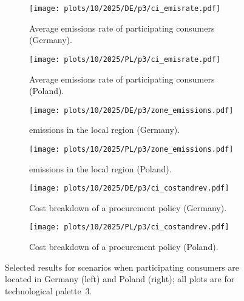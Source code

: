 \begin{figure*}
    \centering
    \begin{subfigure}{0.5\textwidth}
        \centering
        \caption{Average emissions rate of participating consumers (Germany).}
        \texttt{[image: plots/10/2025/DE/p3/ci\_emisrate.pdf]}
        \label{fig:10-2025-DE-p3-ci_emisrate}
    \end{subfigure}%
    \begin{subfigure}{0.5\textwidth}
        \centering
        \caption{Average emissions rate of participating consumers (Poland).}
        \texttt{[image: plots/10/2025/PL/p3/ci\_emisrate.pdf]}
        \label{fig:10-2025-PL-p3-ci_emisrate}
    \end{subfigure}

    \begin{subfigure}{0.5\textwidth}
        \centering
        \caption{\co emissions in the local region (Germany).}
        \texttt{[image: plots/10/2025/DE/p3/zone\_emissions.pdf]}
        \label{fig:10-2025-DE-p3-zone_emissions}
    \end{subfigure}%
    \begin{subfigure}{0.5\textwidth}
        \centering
        \caption{\co emissions in the local region (Poland).}
        \texttt{[image: plots/10/2025/PL/p3/zone\_emissions.pdf]}
        \label{fig:10-2025-PL-p3-zone_emissions}
    \end{subfigure}%

    \begin{subfigure}{0.5\textwidth}
        \centering
        \caption{Cost breakdown of a procurement policy (Germany).}
        \texttt{[image: plots/10/2025/DE/p3/ci\_costandrev.pdf]}
        \label{fig:10-2025-DE-p3-ci_costandrev}
    \end{subfigure}%
    \begin{subfigure}{0.5\textwidth}
        \centering
        \caption{Cost breakdown of a procurement policy (Poland).}
        \texttt{[image: plots/10/2025/PL/p3/ci\_costandrev.pdf]}
        \label{fig:10-2025-PL-p3-ci_costandrev}
    \end{subfigure}
    \caption{Selected results for scenarios when participating consumers are located in Germany (left) and Poland (right); all plots are for technological palette~3.} 
    \label{fig:10-2025-DEPL-p3-4plots}
\end{figure*}


